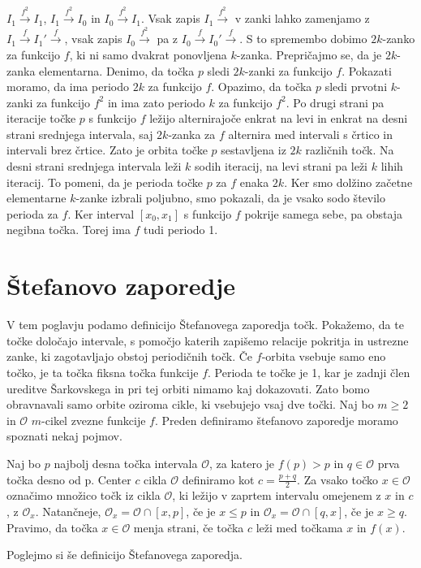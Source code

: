 \documentclass[mat2]{fmfdelo}
\begin{document}
\begin{primer}[6-cikel]
$I_1 \xrightarrow{f^2} I_1$, $I_1 \xrightarrow{f^2} I_0$ in $I_0 \xrightarrow{f^2} I_1$. Vsak zapis $I_1 \xrightarrow{f^2}$ v zanki lahko zamenjamo z $I_1 \xrightarrow{f} I_1'  \xrightarrow{f}$, vsak zapis $I_0 \xrightarrow{f^2} $ pa z $I_0 \xrightarrow{f} I_0'  \xrightarrow{f}$. S to spremembo dobimo $2k$-zanko za funkcijo $f$, ki ni samo dvakrat ponovljena $k$-zanka. Prepričajmo se, da je $2k$-zanka elementarna. Denimo, da točka $p$ sledi $2k$-zanki za funkcijo $f$. Pokazati moramo, da ima periodo $2k$ za funkcijo $f$. Opazimo, da točka $p$ sledi prvotni $k$-zanki za funkcijo $f^2$ in ima zato periodo $k$ za funkcijo $f^2$. Po drugi strani pa iteracije točke $p$ s funkcijo $f$ ležijo alternirajoče enkrat na levi in enkrat na desni strani srednjega intervala, saj $2k$-zanka za $f$ alternira med intervali s črtico in intervali brez črtice. Zato je orbita točke $p$ sestavljena iz $2k$ različnih točk. Na desni strani srednjega intervala leži $k$ sodih iteracij, na levi strani pa leži $k$ lihih iteracij. To pomeni, da je perioda točke $p$ za $f$ enaka $2k$. Ker smo dolžino začetne elementarne $k$-zanke izbrali poljubno, smo pokazali, da je vsako sodo število perioda za $f$. Ker interval $[x_0, x_1]$ s funkcijo $f$ pokrije samega sebe, pa obstaja negibna točka. Torej ima $f$ tudi periodo 1. 
\end{primer}

\section{Štefanovo zaporedje} \label{stefan_zap} 
V tem poglavju podamo definicijo Štefanovega zaporedja točk. Pokažemo, da te točke določajo intervale, s pomočjo katerih zapišemo relacije pokritja in ustrezne zanke, ki zagotavljajo obstoj periodičnih točk. 
Če $f$-orbita vsebuje samo eno točko, je ta točka fiksna točka funkcije $f$. Perioda te točke je 1, kar je zadnji člen ureditve Šarkovskega in pri tej orbiti nimamo kaj dokazovati. Zato bomo obravnavali samo orbite oziroma cikle, ki vsebujejo vsaj dve točki. Naj bo $m \geq 2$ in $\mathcal{O}$ $m$-cikel zvezne funkcije $f$. Preden definiramo štefanovo zaporedje moramo spoznati nekaj pojmov. 

\begin{definicija}
Naj bo $p$ najbolj desna točka intervala $\mathcal{O}$, za katero je $f(p) > p$ in $q\in \mathcal{O}$ prva točka desno od p. Center $c$ cikla $\mathcal{O}$ definiramo kot $c=\frac{p+q}{2}$. Za vsako točko $x \in \mathcal{O}$ označimo množico točk iz cikla $\mathcal{O}$, ki ležijo v zaprtem intervalu omejenem z $x$ in $c$, z $\mathcal{O}_x$. Natančneje, $\mathcal{O}_x = \mathcal{O} \cap [x, p]$, če je $x \leq p$ in  $\mathcal{O}_x = \mathcal{O} \cap [q, x]$, če je $x \geq q$. Pravimo, da točka $x \in \mathcal{O}$ menja strani, če točka $c$ leži med točkama $x$ in $f(x)$.
\end{definicija}
Poglejmo si še definicijo Štefanovega zaporedja.
\end{document}
